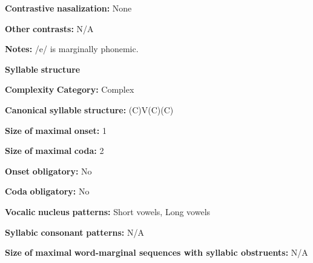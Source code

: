 \documentclass[output=paper]{langsci/langscibook}
\begin{document}
\begin{styleBody}
\textbf{Contrastive} \textbf{nasalization:} None
\end{styleBody}

\begin{styleBody}
\textbf{Other} \textbf{contrasts:} N/A
\end{styleBody}

\begin{styleBody}
\textbf{Notes:} /e/ is marginally phonemic.
\end{styleBody}

\begin{styleBody}
\textbf{Syllable} \textbf{structure}
\end{styleBody}

\begin{styleBody}
\textbf{Complexity} \textbf{Category:} Complex
\end{styleBody}

\begin{styleBody}
\textbf{Canonical} \textbf{syllable} \textbf{structure:} (C)V(C)(C) \citep[94-104]{Bowern2012}
\end{styleBody}

\begin{styleBody}
\textbf{Size} \textbf{of} \textbf{maximal} \textbf{onset:} 1
\end{styleBody}

\begin{styleBody}
\textbf{Size} \textbf{of} \textbf{maximal} \textbf{coda:} 2
\end{styleBody}

\begin{styleBody}
\textbf{Onset} \textbf{obligatory:} No
\end{styleBody}

\begin{styleBody}
\textbf{Coda} \textbf{obligatory:} No
\end{styleBody}

\begin{styleBody}
\textbf{Vocalic} \textbf{nucleus} \textbf{patterns:} Short vowels, Long vowels
\end{styleBody}

\begin{styleBody}
\textbf{Syllabic} \textbf{consonant} \textbf{patterns:} N/A
\end{styleBody}

\begin{styleBody}
\textbf{Size} \textbf{of} \textbf{maximal} \textbf{word{}-marginal sequences with syllabic obstruents:} N/A
\end{styleBody}
\end{document}
